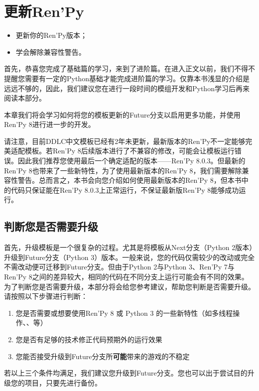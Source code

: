 \documentclass[../../Main.tex]{subfiles}
\begin{document}
\chapter{更新Ren'Py}

\begin{ChapterGoals}
    \begin{itemize}
        \item 更新你的Ren'Py版本；
        \item 学会解除兼容性警告。
    \end{itemize}
\end{ChapterGoals}

首先，恭喜您完成了基础篇的学习，来到了进阶篇。在进入正文以前，我们不得不提醒您需要有一定的Python基础才能完成进阶篇的学习。仅靠本书浅显的介绍是远远不够的，因此，我们建议您在进行一段时间的模组开发和Python学习后再来阅读本部分。

本章我们将会学习如何将您的模板更新的Future分支以启用更多功能，并使用Ren'Py 8进行进一步的开发。

\begin{Warning}
    请注意，目前DDLC中文模板已经有2年未更新，最新版本的Ren'Py不一定能够完美适配模板。若Ren'Py 8后续版本进行了不兼容的修改，可能会让模板运行错误。因此我们推荐您使用最后一个确定适配的版本——Ren'Py 8.0.3。但最新的Ren'Py 8也带来了一些新特性，为了使用最新版本的Ren'Py 8，我们需要解除兼容性警告。总而言之，本书会向您介绍如何使用最新版本的Ren'Py 8，但本书中的代码只保证能在Ren'Py 8.0.3上正常运行，不保证最新版Ren'Py 8能够成功运行。
\end{Warning}

\section{判断您是否需要升级}
首先，升级模板是一个很复杂的过程。尤其是将模板从Next分支（Python 2版本）升级到Future分支（Python 3）版本。一般来说，您的代码仅需较少的改动或完全不需改动便可迁移到Future分支。但由于Python 2与Python 3、Ren'Py 7与Ren'Py 8之间的差异较大，相同的代码在不同分支上运行可能会有不同的效果。为了判断您是否需要升级，本部分将会给您参考建议，帮助您判断是否需要升级。
请按照以下步骤进行判断：
\begin{enumerate}
    \item 您是否需要或想要使用Ren'Py 8 或 Python 3 的一些新特性（如多线程操作、、等）
    \item 您是否有足够的技术修正代码预期外的运行效果
    \item 您能否接受升级到Future分支所\textbf{可能}带来的游戏的不稳定
\end{enumerate}
若以上三个条件均满足，我们建议您升级到Future分支。您也可以出于尝试目的升级您的项目，只要先进行备份。
\end{document}
